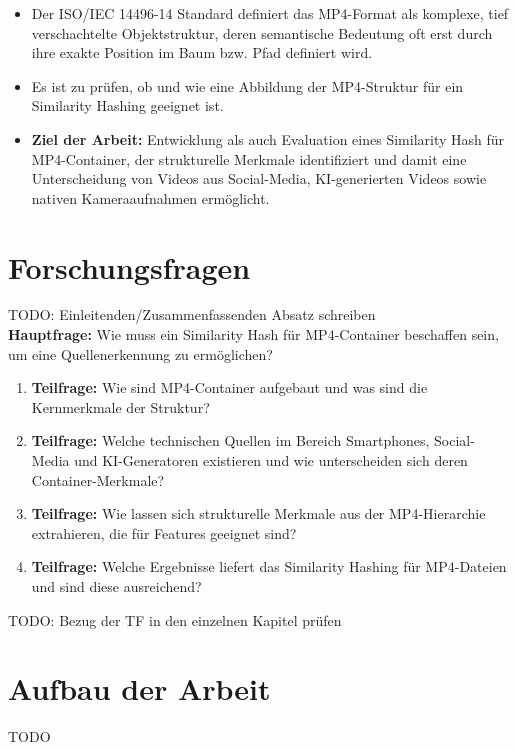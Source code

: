 \begin{itemize}
    \item Der ISO/IEC 14496-14 Standard definiert das MP4-Format als komplexe, tief verschachtelte Objektstruktur, deren semantische Bedeutung oft erst durch ihre exakte Position im Baum bzw. Pfad definiert wird. \cite{iso_14496-14_2020}
    \item Es ist zu prüfen, ob und wie eine Abbildung der MP4-Struktur für ein Similarity Hashing geeignet ist.
    \item \textbf{Ziel der Arbeit:} Entwicklung als auch Evaluation eines Similarity Hash für MP4-Container, der strukturelle Merkmale identifiziert und damit eine Unterscheidung von Videos aus Social-Media,  KI-generierten Videos sowie nativen Kameraaufnahmen ermöglicht.
\end{itemize}


\section{Forschungsfragen }

TODO: Einleitenden/Zusammenfassenden Absatz schreiben\\

\textbf{Hauptfrage:} Wie muss ein Similarity Hash für MP4-Container beschaffen sein, um eine Quellenerkennung zu ermöglichen?

\begin{enumerate}
    \item \textbf{Teilfrage:} Wie sind MP4-Container aufgebaut und was sind die Kernmerkmale der Struktur?
    \item \textbf{Teilfrage:} Welche technischen Quellen im Bereich Smartphones, Social-Media und KI-Generatoren existieren und wie unterscheiden sich deren Container-Merkmale?
    \item \textbf{Teilfrage:} Wie lassen sich strukturelle Merkmale aus der MP4-Hierarchie extrahieren, die für Features geeignet sind?
    \item \textbf{Teilfrage:} Welche Ergebnisse liefert das Similarity Hashing für MP4-Dateien und sind diese ausreichend?
\end{enumerate}

TODO: Bezug der TF in den einzelnen Kapitel prüfen


\section{Aufbau der Arbeit}

TODO